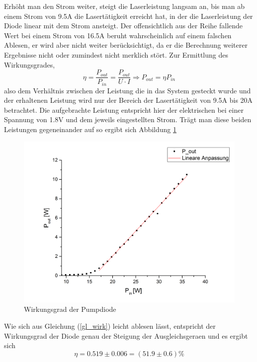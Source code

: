 Erhöht man den Strom weiter, steigt die Laserleistung langsam an, bis man ab einem Strom von 9.5A die Lasertätigkeit erreicht hat, in der die Laserleistung der Diode linear mit dem Strom ansteigt. \newline
Der offensichtlich aus der Reihe fallende Wert bei einem Strom von 16.5A beruht wahrscheinlich auf einem falschen Ablesen, er wird aber nicht weiter berücksichtigt, da er die Berechnung weiterer Ergebnisse nicht oder zumindest nicht merklich stört. \newline
Zur Ermittlung des Wirkungsgrades, 
\begin{equation}
\eta=\frac{P_{out}}{P_{in}}=\frac{P_{out}}{U\cdot I}\Longrightarrow P_{out}=\eta P_{in}
\label{gl_wirk}
\end{equation}
also dem Verhältnis zwischen der Leistung die in das System gesteckt wurde und der erhaltenen Leistung wird nur der Bereich der Lasertätigkeit von 9.5A bis 20A betrachtet. Die aufgebrachte Leistung entspricht hier der elektrischen bei einer Spannung von 1.8V und dem jeweils eingestellten Strom. Trägt man diese beiden Leistungen gegeneinander auf so ergibt sich \newline Abbildung \ref{wirkung}
\begin{figure}[H]
	\begin{center}
		\includegraphics[scale=.5]{Bilder/Wirkungsgrad.png}
		\caption{Wirkungsgrad der Pumpdiode}
		\label{wirkung}
	\end{center}
\end{figure}
Wie sich aus Gleichung (\ref{gl_wirk}) leicht ablesen lässt, entspricht der Wirkungsgrad der Diode genau der Steigung der Ausgleichsgeraen und es ergibt sich
\begin{equation}
\eta=0.519\pm0.006=(51.9\pm0.6)\%
\end{equation}
